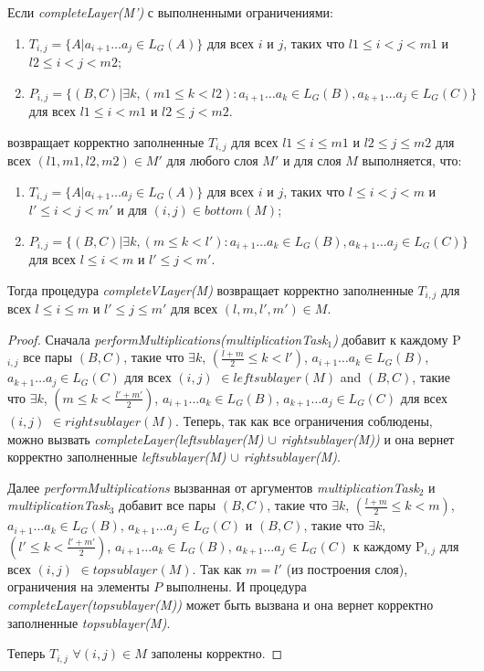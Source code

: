 \documentclass[14pt]{matmex-diploma-custom}
\begin{document}
\begin{lemma}
Если \textit{completeLayer(M')} с выполненными ограничениями:
\begin{enumerate}
  \item $T_{i, j} = \{ A |  a_{i + 1} \dots a_{j} \in L_G(A)\}$ для всех $i$ и $j$, таких что $l1 \leq i < j < m1$ и $l2 \leq i < j < m2$;
  \item $P_{i, j} =  \{ (B, C) |\exists k, (m1 \le k < l2): a_{i + 1} \dots a_{k} \in L_G(B), a_{k + 1} \dots a_{j} \in L_G(C)\}$ для всех $l1 \leq i < m1$ и $l2 \leq j < m2$.
\end{enumerate}
возвращает корректно заполненные $T_{i, j}$ для всех $l1 \leq i \le m1$ и $l2 \leq j \le m2$ для всех $(l1, m1, l2, m2) \in M'$ для любого слоя $M'$ 
и для слоя $M$ выполняется, что: 
\begin{enumerate}
  \item $T_{i, j} = \{ A |  a_{i + 1} \dots a_{j} \in L_G(A)\}$ для всех $i$ и $j$, таких что $l \leq i < j < m$ и $l' \leq i < j < m'$ и для $(i, j) \in bottom(M)$;
  \item $P_{i, j} =  \{ (B, C) |\exists k, (m \le k < l'): a_{i + 1} \dots a_{k} \in L_G(B), a_{k + 1} \dots a_{j} \in L_G(C)\}$ для всех $l \leq i < m$ и $l' \leq j < m'$.
\end{enumerate}

Тогда процедура \textit{completeVLayer(M)} возвращает корректно заполненные $T_{i, j}$ для всех $l \leq i \le m$ и $l' \leq j \le m'$ для всех $(l, m, l', m') \in M$. 
\end{lemma}

\begin{proof}

Сначала \textit{performMultiplications(multiplicationTask$_1$)} добавит к каждому P$_{i,j}$ все пары 
$(B, C)$, такие что $\exists k$, $(\frac{l+m}{2} \le k < l')$, $a_{i + 1} \dots a_{k} \in L_{G}(B)$, $a_{k + 1} \dots a_{j} \in L_{G}(C)$ для всех $(i, j)$ $\in leftsublayer(M)$
and
$(B, C)$, такие что $\exists k$, $(m \le k < \frac{l'+m'}{2})$, $a_{i + 1} \dots a_{k} \in L_{G}(B)$, $a_{k + 1} \dots a_{j} \in L_{G}(C)$ для всех $(i, j)$ $\in rightsublayer(M)$.
Теперь, так как все ограничения соблюдены, можно вызвать \textit{completeLayer(leftsublayer(M) $\cup$ rightsublayer(M))} и она вернет корректно заполненные \textit{leftsublayer(M) $\cup$ rightsublayer(M)}.

Далее \textit{performMultiplications} вызванная от аргументов
\textit{multiplicationTask$_2$} и \textit{multiplicationTask$_3$} добавит все пары
$(B, C)$, такие что $\exists k$, $(\frac{l+m}{2} \le k < m)$, $a_{i + 1} \dots a_{k} \in L_{G}(B)$, $a_{k + 1} \dots a_{j} \in L_{G}(C)$ 
и 
$(B, C)$, такие что $\exists k$, $(l' \le k < \frac{l'+m'}{2})$, $a_{i + 1} \dots a_{k} \in L_{G}(B)$, $a_{k + 1} \dots a_{j} \in L_{G}(C)$
к каждому P$_{i,j}$ для всех $(i, j)$ $\in topsublayer(M)$. 
Так как $m = l'$ (из построения слоя), ограничения на элементы $P$ выполнены.
И процедура \textit{completeLayer(topsublayer(M))} может быть вызвана и она вернет корректно заполненные \textit{topsublayer(M)}.

Теперь $T_{i, j}$ $\forall (i, j) \in M$ заполены корректно.

\end{proof}
\end{document}

